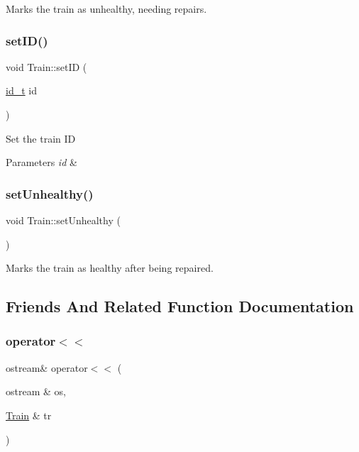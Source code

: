 Marks the train as unhealthy, needing repairs. \mbox{\label{classTrain_a9a8b1feb180da07e26c90919a0c32406}} 
\subsubsection{\texorpdfstring{set\+I\+D()}{setID()}}
{\footnotesize\ttfamily void Train\+::set\+ID (\begin{DoxyParamCaption}\item[{\mbox{\hyperlink{project__utils_8h_a8f3a969054ad2200720b96e7e23dd4e1}{id\+\_\+t}}}]{id }\end{DoxyParamCaption})}

Set the train ID


\begin{DoxyParams}{Parameters}
{\em id} & \\
\hline
\end{DoxyParams}
\mbox{\label{classTrain_a2e6fc233ded428364670c07a46f08891}} 
\subsubsection{\texorpdfstring{set\+Unhealthy()}{setUnhealthy()}}
{\footnotesize\ttfamily void Train\+::set\+Unhealthy (\begin{DoxyParamCaption}{ }\end{DoxyParamCaption})}

Marks the train as healthy after being repaired. 

\subsection{Friends And Related Function Documentation}
\mbox{\label{classTrain_a8d9438650288814c061279ef0dc73dcd}} 
\subsubsection{\texorpdfstring{operator$<$$<$}{operator<<}}
{\footnotesize\ttfamily ostream\& operator$<$$<$ (\begin{DoxyParamCaption}\item[{ostream \&}]{os,  }\item[{\mbox{\hyperlink{classTrain}{Train}} \&}]{tr }\end{DoxyParamCaption})\hspace{0.3cm}{\ttfamily [friend]}}

